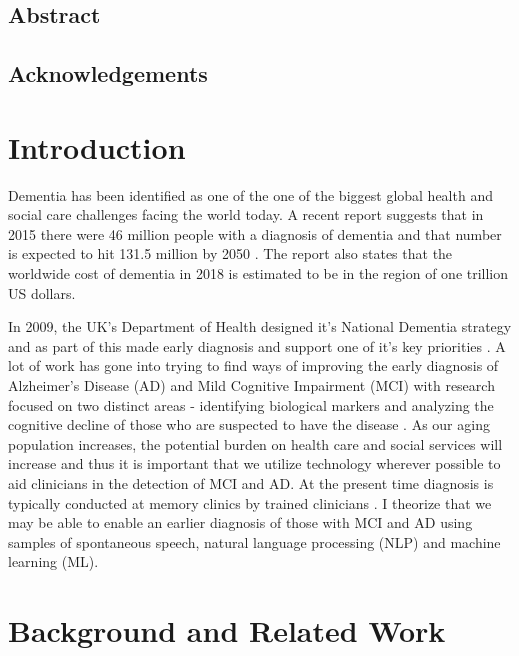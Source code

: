 \documentclass[twopages, a4paper]{book}
\begin{document}
\maketitle
\newpage
\section*{Abstract}
\newpage
\section*{Acknowledgements}
\newpage
\tableofcontents
\newpage
\listoffigures
\listoftables
\chapter{Introduction}
Dementia has been identified as one of the one of the biggest global health and social care challenges facing the world today. A recent report suggests that in 2015 there were 46 million people with a diagnosis of dementia and that number is expected to hit 131.5 million by 2050 \cite{Prince2015}. The report also states that the worldwide cost of dementia in 2018 is estimated to be in the region of one trillion US dollars.
\par
In 2009, the UK's Department of Health designed it's National Dementia strategy and as part of this made early diagnosis and support one of it's key priorities \cite{England2009}. A lot of work has gone into trying to find ways of improving the early diagnosis of Alzheimer's Disease (AD) and Mild Cognitive Impairment (MCI) with research focused on two distinct areas - identifying biological markers and analyzing the cognitive decline of those who are suspected to have the disease \cite{Taler2008}. As our aging population increases, the potential burden on health care and social services will increase and thus it is important that we utilize technology wherever possible to aid clinicians in the detection of MCI and AD. At the present time diagnosis is typically conducted at memory clinics by trained clinicians \cite{Boschi2017}. I theorize that we may be able to enable an earlier diagnosis of those with MCI and AD using samples of spontaneous speech, natural language processing (NLP) and machine learning (ML).
\par
\chapter{Background and Related Work}
\end{document}
